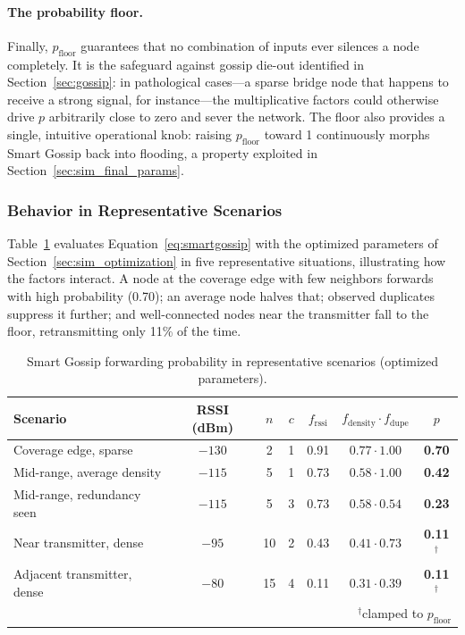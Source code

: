 \documentclass[english,bachelor]{tfgitic}[2026/01/22]
\begin{document}
\paragraph{The probability floor.} Finally, $p_{\text{floor}}$ guarantees that no combination of inputs ever silences a node completely. It is the safeguard against gossip die-out identified in Section~\ref{sec:gossip}: in pathological cases---a sparse bridge node that happens to receive a strong signal, for instance---the multiplicative factors could otherwise drive $p$ arbitrarily close to zero and sever the network. The floor also provides a single, intuitive operational knob: raising $p_{\text{floor}}$ toward 1 continuously morphs Smart Gossip back into flooding, a property exploited in Section~\ref{sec:sim_final_params}.
 
\subsubsection{Behavior in Representative Scenarios}
 
Table~\ref{tab:sg_examples} evaluates Equation~\eqref{eq:smartgossip} with the optimized parameters of Section~\ref{sec:sim_optimization} in five representative situations, illustrating how the factors interact. A node at the coverage edge with few neighbors forwards with high probability (0.70); an average node halves that; observed duplicates suppress it further; and well-connected nodes near the transmitter fall to the floor, retransmitting only 11\% of the time.

\begin{table}[htbp]
    \centering
    \caption{Smart Gossip forwarding probability in representative scenarios (optimized parameters).}
    \label{tab:sg_examples}
    \begin{tabular}{lcccccc}
        \toprule
        Scenario & RSSI (dBm) & $n$ & $c$ & $f_{\text{rssi}}$ & $f_{\text{density}} \cdot f_{\text{dupe}}$ & $p$ \\
        \midrule
        Coverage edge, sparse      & $-130$ & 2  & 1 & 0.91 & $0.77 \cdot 1.00$ & \textbf{0.70} \\
        Mid-range, average density & $-115$ & 5  & 1 & 0.73 & $0.58 \cdot 1.00$ & \textbf{0.42} \\
        Mid-range, redundancy seen & $-115$ & 5  & 3 & 0.73 & $0.58 \cdot 0.54$ & \textbf{0.23} \\
        Near transmitter, dense    & $-95$  & 10 & 2 & 0.43 & $0.41 \cdot 0.73$ & \textbf{0.11}$^{\dagger}$ \\
        Adjacent transmitter, dense& $-80$  & 15 & 4 & 0.11 & $0.31 \cdot 0.39$ & \textbf{0.11}$^{\dagger}$ \\
        \bottomrule
        \multicolumn{7}{r}{\footnotesize $^{\dagger}$clamped to $p_{\text{floor}}$}
    \end{tabular}
\end{table}
 
\end{document}
